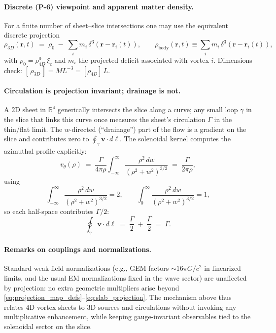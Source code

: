 \paragraph{Discrete (P-6) viewpoint and apparent matter density.}
For a finite number of sheet–slice intersections one may use the equivalent discrete projection
\begin{equation}
  \rho_{3D}(\mathbf r,t)
  \;=\;
  \rho_0 \;-\; \sum_i m_i\,\delta^3(\mathbf r-\mathbf r_i(t)),
  \qquad
  \rho_{\text{body}}(\mathbf r,t)\equiv \sum_i m_i\,\delta^3(\mathbf r-\mathbf r_i(t)),
  \label{eq:rho3D_discrete}
\end{equation}
with $\rho_0=\rho_{4D}^0\,\xi_c$ and $m_i$ the projected deficit associated with vortex $i$. Dimensions check: $[\,\rho_{3D}\,]=ML^{-3}= [\rho_{4D}]\,L$.

\paragraph{Circulation is projection invariant; drainage is not.}
A $2$D sheet in $\mathbb R^4$ generically intersects the slice along a curve; any small loop $\gamma$ in the slice that links this curve once measures the sheet's circulation $\Gamma$ in the thin/flat limit. The $w$-directed (“drainage”) part of the flow is a gradient on the slice and contributes zero to $\oint_\gamma \mathbf v\cdot d\boldsymbol\ell$. The solenoidal kernel computes the azimuthal profile explicitly:
\begin{equation}
  v_\theta(\rho)
  \;=\; \frac{\Gamma}{4\pi\rho}\int_{-\infty}^{\infty}
  \frac{\rho^2\,dw}{(\rho^2+w^2)^{3/2}}
  \;=\; \frac{\Gamma}{2\pi\rho},
  \label{eq:vtheta_kernel}
\end{equation}
using
\begin{equation}
  \int_{-\infty}^{\infty} \frac{\rho^2\,dw}{(\rho^2+w^2)^{3/2}}=2,
  \qquad
  \int_{0}^{\infty} \frac{\rho^2\,dw}{(\rho^2+w^2)^{3/2}}=1,
  \label{eq:halfspace_integrals}
\end{equation}
so each half-space contributes $\Gamma/2$:
\begin{equation}
  \oint_{\gamma}\mathbf v\cdot d\boldsymbol{\ell}
  \;=\; \frac{\Gamma}{2} \;+\; \frac{\Gamma}{2} \;=\; \Gamma .
  \label{eq:circulation_split}
\end{equation}

\paragraph{Remarks on couplings and normalizations.}
Standard weak-field normalizations (e.g., GEM factors $\sim 16\pi G/c^2$ in linearized limits, and the usual EM normalizations fixed in the wave sector) are unaffected by projection: no extra geometric multipliers arise beyond \eqref{eq:projection_map_defs}–\eqref{eq:slab_projection}. The mechanism above thus relates $4$D vortex sheets to $3$D sources and circulations without invoking any multiplicative enhancement, while keeping gauge-invariant observables tied to the solenoidal sector on the slice.

